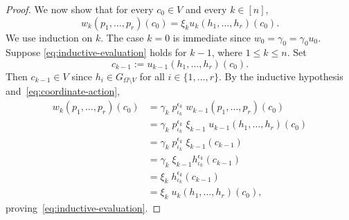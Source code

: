 \documentclass{article}
\theoremstyle{remark}
\theoremstyle{definition}
\begin{document}
{\begin{proof}


We now show that for every $c_0\in V$ and every $k\in [n]$,
\begin{equation}\label{eq:inductive-evaluation}
  {w}_k(p_1,\ldots,p_r)(c_0)
  =\xi_k u_k(h_1,\ldots,h_r)(c_0).
\end{equation}
We use induction on $k$. The case $k=0$
is immediate since ${w}_0=\gamma_0=\gamma_0 u_0$. Suppose \eqref{eq:inductive-evaluation} holds for $k-1$, where $1\leq k\leq n$. Set 
\[
  c_{k-1}:=u_{k-1}(h_1,\ldots,h_r)(c_0).
\]
 Then $c_{k-1}\in V$ since $h_i\in G_{\Omega\setminus V}$ for all $i\in\{1,\ldots,r\}$. %
By the inductive hypothesis and~\eqref{eq:coordinate-action},
\[
\begin{aligned}
  {w}_k(p_1,\ldots,p_r)(c_0)
  &=\gamma_k\; p_{\iota_k}^{{\epsilon}_k}\;  w_{k-1}(p_1,\ldots,p_r)(c_0)\\
  &=\gamma_k\;  p_{\iota_k}^{{\epsilon}_k}\;  \xi_{k-1}\;u_{k-1}(h_1,\ldots,h_r)(c_0)\\
  &=\gamma_k\;  p_{\iota_k}^{{\epsilon}_k}\;  \xi_{k-1}(c_{k-1})\\
  &=\gamma_k\; \xi_{k-1}
    h_{\iota_k}^{{\epsilon}_k}(c_{k-1})\\
    &=\xi_{k}\; 
    h_{\iota_k}^{{\epsilon}_k}(c_{k-1})\\
  &=\xi_k\; u_k(h_1,\ldots,h_r)(c_0),
\end{aligned}
\]
proving~\eqref{eq:inductive-evaluation}. 


\end{proof}}
\end{document}
